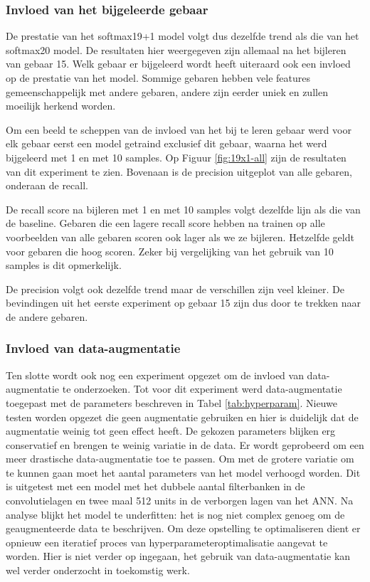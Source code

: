 \subsubsection{Invloed van het bijgeleerde gebaar}

De prestatie van het softmax19+1 model volgt dus dezelfde trend als die van het softmax20 model. De resultaten hier weergegeven zijn allemaal na het bijleren van gebaar 15. Welk gebaar er bijgeleerd wordt heeft uiteraard ook een invloed op de prestatie van het model. Sommige gebaren hebben vele features gemeenschappelijk met andere gebaren, andere zijn eerder uniek en zullen moeilijk herkend worden.

\npar Om een beeld te scheppen van de invloed van het bij te leren gebaar werd voor elk gebaar eerst een model getraind exclusief dit gebaar, waarna het werd bijgeleerd met 1 en met 10 samples. Op Figuur \ref{fig:19x1-all} zijn de resultaten van dit experiment te zien. Bovenaan is de precision uitgeplot van alle gebaren, onderaan de recall.

\npar De recall score na bijleren met 1 en met 10 samples volgt dezelfde lijn als die van de baseline. Gebaren die een lagere recall score hebben na trainen op alle voorbeelden van alle gebaren scoren ook lager als we ze bijleren. Hetzelfde geldt voor gebaren die hoog scoren. Zeker bij vergelijking van het gebruik van 10 samples is dit opmerkelijk.

\npar De precision volgt ook dezelfde trend maar de verschillen zijn veel kleiner. De bevindingen uit het eerste experiment op gebaar 15 zijn dus door te trekken naar de andere gebaren.

\subsubsection{Invloed van data-augmentatie}
Ten slotte wordt ook nog een experiment opgezet om de invloed van data-augmentatie te onderzoeken. Tot voor dit experiment werd data-augmentatie toegepast met de parameters beschreven in Tabel \ref{tab:hyperparam}. Nieuwe testen worden opgezet die geen augmentatie gebruiken en hier is duidelijk dat de augmentatie weinig tot geen effect heeft. De gekozen parameters blijken erg conservatief en brengen te weinig variatie in de data. Er wordt geprobeerd om een meer drastische data-augmentatie toe te passen. Om met de grotere variatie om te kunnen gaan moet het aantal parameters van het model verhoogd worden. Dit is uitgetest met een model met het dubbele aantal filterbanken in de convolutielagen en twee maal 512 units in de verborgen lagen van het ANN. Na analyse blijkt het model te underfitten: het is nog niet complex genoeg om de geaugmenteerde data te beschrijven. Om deze opstelling te optimaliseren dient er opnieuw een iteratief proces van hyperparameteroptimalisatie aangevat te worden. Hier is niet verder op ingegaan, het gebruik van data-augmentatie kan wel verder onderzocht in toekomstig werk.

